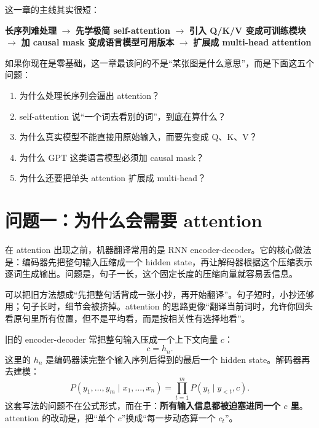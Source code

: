 \documentclass[11pt,a4paper]{ctexart}
\begin{document}
这一章的主线其实很短：

\begin{center}
\textbf{长序列难处理}
$\rightarrow$
\textbf{先学极简 self-attention}
$\rightarrow$
\textbf{引入 Q/K/V 变成可训练模块}
$\rightarrow$
\textbf{加 causal mask 变成语言模型可用版本}
$\rightarrow$
\textbf{扩展成 multi-head attention}
\end{center}

如果你现在是零基础，这一章最该问的不是“某张图是什么意思”，而是下面这五个问题：

\begin{enumerate}
  \item 为什么处理长序列会逼出 attention？
  \item self-attention 说“一个词去看别的词”，到底在算什么？
  \item 为什么真实模型不能直接用原始输入，而要先变成 Q、K、V？
  \item 为什么 GPT 这类语言模型必须加 causal mask？
  \item 为什么还要把单头 attention 扩展成 multi-head？
\end{enumerate}

\section{问题一：为什么会需要 attention}

\begin{problemblock}
在 attention 出现之前，机器翻译常用的是 RNN encoder-decoder。它的核心做法是：编码器先把整句输入压缩成一个 hidden state，再让解码器根据这个压缩表示逐词生成输出。问题是，句子一长，这个固定长度的压缩向量就容易丢信息。
\end{problemblock}

\begin{intuitionblock}
可以把旧方法想成“先把整句话背成一张小抄，再开始翻译”。句子短时，小抄还够用；句子长时，细节会被挤掉。attention 的思路更像“翻译当前词时，允许你回头看原句里所有位置，但不是平均看，而是按相关性有选择地看”。
\end{intuitionblock}

\begin{mathblock}
旧的 encoder-decoder 常把整句输入压成一个上下文向量 \(c\)：
\[
c = h_n .
\]
这里的 \(h_n\) 是编码器读完整个输入序列后得到的最后一个 hidden state。解码器再去建模：
\[
P(y_1,\ldots,y_m \mid x_1,\ldots,x_n)
=
\prod_{t=1}^{m} P(y_t \mid y_{<t}, c).
\]
这套写法的问题不在公式形式，而在于：\textbf{所有输入信息都被迫塞进同一个 \(c\) 里}。attention 的改动是，把“单个 \(c\)”换成“每一步动态算一个 \(c_t\)”。
\end{mathblock}
\end{document}
